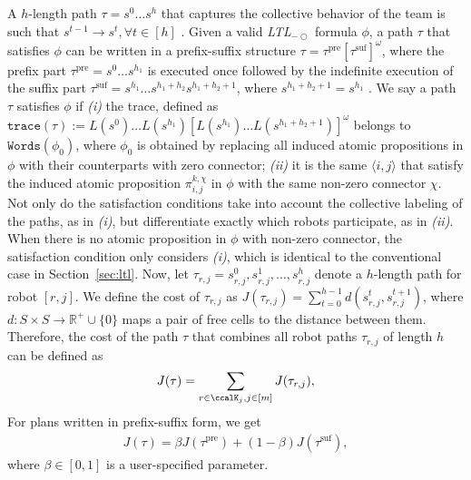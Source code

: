\documentclass[Afour,sageh,times]{sagej}
\newcommand{\ltl}{ {\it LTL}$_{-\bigcirc}$ }
\newcommand{\ag}[2]{\langle#1,#2\rangle}
\renewcommand{\ap}[3]{\mathcal{\pi}_{{#1},{#2}}^{#3}}
\begin{document}
 A $h$-length path $\tau = s^0 \ldots s^h$ that captures the collective behavior of the team is such that $s^{t-1}\to s^{t}, \forall t\in[h]$%
 .  Given a valid\ltl formula $\phi$, a  path $\tau$ that satisfies $\phi$ can be written in a prefix-suffix structure $\tau=\tau^{\text{pre}}[\tau^{\text{suf}}]^\omega$, where the prefix part  $\tau^{\text{pre}}=s^0 \dots s^{h_1}$ is executed once followed by the indefinite execution of the suffix part $\tau^{\text{suf}}=s^{h_1} \dots s^{h_1+h_2} s^{h_1+h_2+1}$, where $s^{h_1+h_2+1}=s^{h_1}$ \citep{baier2008principles}. We say a path $\tau$ satisfies $\phi$ if {\it (i)} the trace, defined as $\texttt{trace}(\tau):=L(s^0)\dots L(s^{h_1})[L(s^{h_1})\dots L(s^{h_1+h_2+1})]^{\omega}$  belongs to $\texttt{Words}(\phi_0)$, where $\phi_0$ is obtained by replacing all induced atomic propositions in $\phi$ with their counterparts with zero connector; {\it (ii)} it is the same $\ag{i}{j}$ that satisfy the induced atomic proposition $\ap{i}{j}{k,\chi}$ in $\phi$ with the same non-zero connector $\chi$. Not only do the satisfaction conditions take into account the collective labeling of the paths, as in {\it (i)}, but differentiate exactly which robots participate, as in {\it (ii)}. When there is no atomic proposition in $\phi$ with non-zero connector, the satisfaction condition only considers {\it (i)}, which is identical to the conventional case in Section~\ref{sec:ltl}. Now, let $\tau_{r,j} = s_{r,j}^0, s_{r,j}^1, \ldots, s_{r,j}^h$ denote a $h$-length path  for robot $[r,j]$. We define the cost of $\tau_{r,j}$  as $J(\tau_{r,j}) = \sum_{t=0}^{h-1} d(s_{r,j}^{t}, s_{r,j}^{t+1})$, where $d: S\times S \to \mathbb{R}^+\cup\{0\}$ maps a pair of free cells to the distance between them. Therefore, the cost of the path $\tau$ that combines all robot paths $\tau_{r,j}$ of length $h$ can be defined as
\begingroup\makeatletter\def\f@size{10}\check@mathfonts
\def\maketag@@@#1{\hbox{\m@th\normalsize\normalfont#1}}%
\begin{align}
  J(\tau) = \sum_{{r \in \ccalK_j, j \in [m]}} J(\tau_{r,j}),
\end{align}
\endgroup
For  plans written in prefix-suffix form, we get
\begingroup\makeatletter\def\f@size{10}\check@mathfonts
\def\maketag@@@#1{\hbox{\m@th\normalsize\normalfont#1}}%
\begin{align}\label{eq:cost}
J(\tau) = \beta J(\tau^{\text{pre}}) + (1-\beta) J(\tau^{\text{suf}}),
\end{align}
\endgroup
where $\beta\in [0,1]$ is a user-specified parameter.
\end{document}

